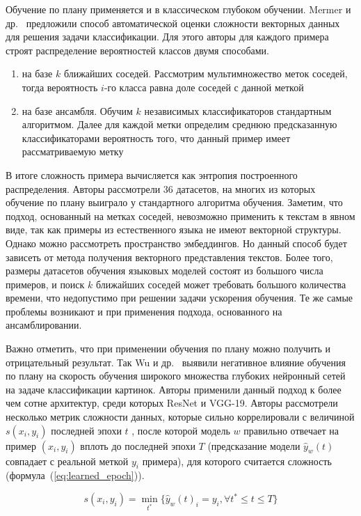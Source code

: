 \documentclass{spbau-diploma}
\begin{document}
Обучение по плану применяется и в классическом глубоком обучении. Mermer и др.~\cite{mermer2017scalable} предложили способ автоматической оценки сложности векторных данных для решения задачи классификации. Для этого авторы для каждого примера строят распределение вероятностей классов двумя способами.
\begin{enumerate}
	\item на базе $k$ ближайших соседей. Рассмотрим мультимножество меток соседей, тогда вероятность $i$-го класса равна доле соседей с данной меткой
	\item на базе ансамбля. Обучим $k$ независимых классификаторов стандартным алгоритмом. Далее для каждой метки определим среднюю предсказанную классификаторами вероятность того, что данный пример имеет рассматриваемую метку
\end{enumerate}
	
В итоге сложность примера вычисляется как энтропия построенного распределения. Авторы рассмотрели $36$ датасетов, на многих из которых обучение по плану выиграло у стандартного алгоритма обучения. Заметим, что подход, основанный на метках соседей, невозможно применить к текстам в явном виде, так как примеры из естественного языка не имеют векторной структуры. Однако можно рассмотреть пространство эмбеддингов. Но данный способ будет зависеть от метода получения векторного представления текстов. Более того, размеры датасетов обучения языковых моделей состоят из большого числа примеров, и поиск $k$ ближайших соседей может требовать большого количества времени, что недопустимо при решении задачи ускорения обучения. Те же самые проблемы возникают и при применения подхода, основанного на ансамблировании.

Важно отметить, что при применении обучения по плану можно получить и отрицательный результат. Так Wu и др.~\cite{wu2020curricula} выявили негативное влияние обучения по плану на скорость обучения широкого множества глубоких нейронный сетей на задаче классификации картинок. Авторы применили данный подход к более чем сотне архитектур, среди которых ResNet и VGG-19. Авторы рассмотрели несколько метрик сложности данных, которые сильно коррелировали с величиной $s(x_i, y_i)$ последней эпохи $t$	, после которой модель $w$ правильно отвечает на пример $(x_i, y_i)$ вплоть до последней эпохи $T$ (предсказание модели $\hat{y}_w(t)$ совпадает с реальной меткой $y_i$ примера), для которого считается сложность (формула~(\ref{eq:learned_epoch})). 

\begin{equation} \label{eq:learned_epoch}
s(x_i, y_i) = \min_{t^*}\{\hat{y}_w(t)_i = y_i,\forall t^* \le t \le T\}
\end{equation}
\end{document}
